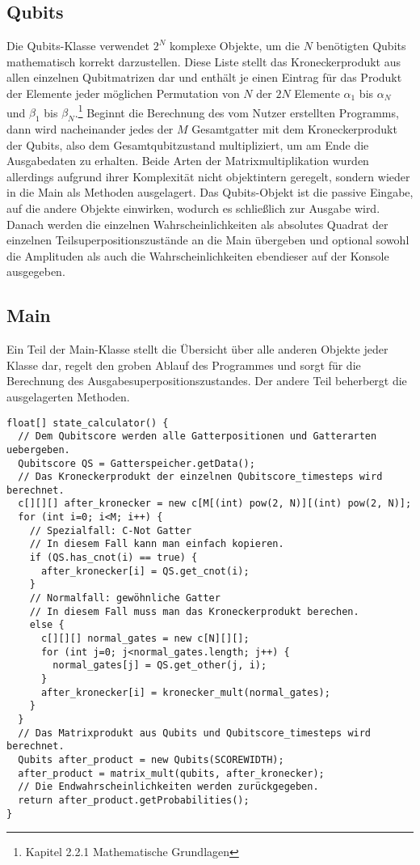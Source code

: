\documentclass[12pt]{report}
\begin{document}
\subsection{Qubits}
Die \glqq Qubits\grqq{}-Klasse verwendet $2^{N}$ komplexe Objekte, um die $N$ benötigten Qubits mathematisch korrekt darzustellen. Diese Liste stellt das Kroneckerprodukt aus allen einzelnen Qubitmatrizen dar und enthält je einen Eintrag für das Produkt der Elemente jeder möglichen Permutation von $N$ der $2N$ Elemente $\alpha_1$ bis $\alpha_{N}$ und $\beta_1$ bis $\beta_{N}$.\footnote{Kapitel 2.2.1 Mathematische Grundlagen} Beginnt die Berechnung des vom Nutzer erstellten Programms, dann wird nacheinander jedes der $M$ Gesamtgatter mit dem Kroneckerprodukt der Qubits, also dem Gesamtqubitzustand multipliziert, um am Ende die Ausgabedaten zu erhalten. Beide Arten der Matrixmultiplikation wurden allerdings aufgrund ihrer Komplexität nicht objektintern geregelt, sondern wieder in die Main als Methoden ausgelagert. Das \glqq Qubits\grqq{}-Objekt ist die passive Eingabe, auf die andere Objekte einwirken, wodurch es schließlich zur Ausgabe wird. Danach werden die einzelnen Wahrscheinlichkeiten als absolutes Quadrat der einzelnen Teilsuperpositionszustände an die Main übergeben und optional sowohl die Amplituden als auch die Wahrscheinlichkeiten ebendieser auf der Konsole ausgegeben.

\subsection{Main}
Ein Teil der \glqq Main\grqq{}-Klasse stellt die Übersicht über alle anderen Objekte jeder Klasse dar, regelt den groben Ablauf des Programmes und sorgt für die Berechnung des Ausgabesuperpositionszustandes. Der andere Teil beherbergt die ausgelagerten Methoden.
\lstset{escapechar=@,style=customc}
\begin{lstlisting}
float[] state_calculator() {
  // Dem Qubitscore werden alle Gatterpositionen und Gatterarten uebergeben.
  Qubitscore QS = Gatterspeicher.getData();
  // Das Kroneckerprodukt der einzelnen Qubitscore_timesteps wird berechnet.
  c[][][] after_kronecker = new c[M[(int) pow(2, N)][(int) pow(2, N)];
  for (int i=0; i<M; i++) {
  	// Spezialfall: C-Not Gatter
  	// In diesem Fall kann man einfach kopieren.
    if (QS.has_cnot(i) == true) {
      after_kronecker[i] = QS.get_cnot(i);
    }
    // Normalfall: gewöhnliche Gatter
    // In diesem Fall muss man das Kroneckerprodukt berechen.
    else {
      c[][][] normal_gates = new c[N][][];
      for (int j=0; j<normal_gates.length; j++) {
        normal_gates[j] = QS.get_other(j, i);
      }
      after_kronecker[i] = kronecker_mult(normal_gates);
    }
  }
  // Das Matrixprodukt aus Qubits und Qubitscore_timesteps wird berechnet.
  Qubits after_product = new Qubits(SCOREWIDTH);
  after_product = matrix_mult(qubits, after_kronecker);
  // Die Endwahrscheinlichkeiten werden zurückgegeben.
  return after_product.getProbabilities();
}
\end{lstlisting}
\newpage
\end{document}
